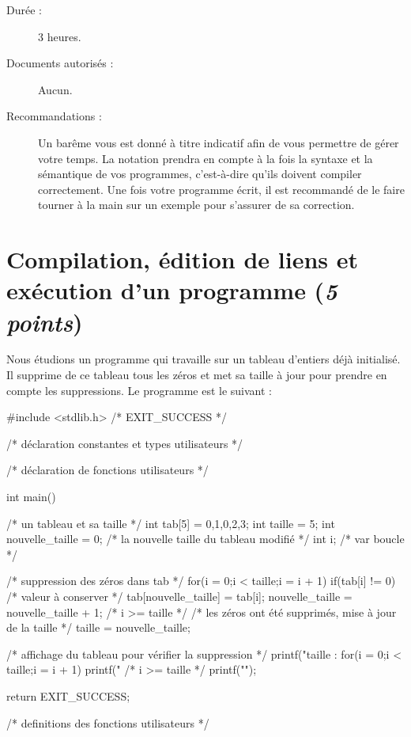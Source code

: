 
\newcommand{\commentaire}[1]{}


\begin{description}
\item[Durée :] 3 heures.
\item[Documents autorisés :] Aucun.
\item[Recommandations :] Un barême vous est donné à
titre indicatif afin de vous permettre de gérer votre temps. La
notation prendra en compte à la fois la syntaxe et la sémantique de
vos programmes, c'est-à-dire qu'ils doivent compiler correctement. Une
fois votre programme écrit, il est recommandé de le faire tourner à la
main sur un exemple pour s'assurer de sa correction.
\end{description}

\section{Compilation, édition de liens et exécution d'un programme (\textit{5 points})}
\label{tableau_sans_zero}

Nous étudions un programme qui travaille sur un tableau d'entiers déjà
initialisé. Il supprime de ce tableau tous les zéros et met sa
taille à jour pour prendre en compte les suppressions. Le programme est le suivant :

\begin{small}
\begin{listing}{1}
#include <stdlib.h> /* EXIT_SUCCESS */

/* déclaration constantes et types utilisateurs */

/* déclaration de fonctions utilisateurs */

int main()
{
    /* un tableau et sa taille */
    int tab[5] = {0,1,0,2,3};
    int taille = 5;
    int nouvelle_taille = 0; /* la nouvelle taille du tableau modifié */
    int i; /* var boucle */
 
    /* suppression des zéros dans tab */
    for(i = 0;i < taille;i = i + 1)
    {
        if(tab[i] != 0) /* valeur à conserver */
        {
            tab[nouvelle_taille] = tab[i];
            nouvelle_taille = nouvelle_taille + 1;
        }
    }
    /* i >= taille */
    /* les zéros ont été supprimés,
       mise à jour de la taille */
    taille = nouvelle_taille;
 
    /* affichage du tableau pour vérifier la suppression */
    printf("taille : %
    for(i = 0;i < taille;i = i + 1)
    {
        printf("%
    }
    /* i >= taille */
    printf("\n");
 
    return EXIT_SUCCESS;
}

/* definitions des fonctions utilisateurs */
\end{listing}
\end{small}

